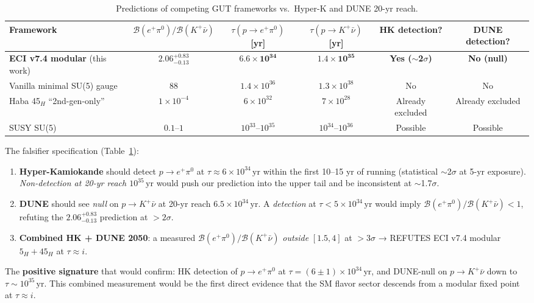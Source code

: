 \documentclass[reprint,prl,nofootinbib,floatfix,linenumbers]{revtex4-2}
\newcommand{\yr}{\,\mathrm{yr}}
\newcommand{\Br}[1]{\mathcal{B}(#1)}
\begin{document}
\begin{table}[t]
\centering
\caption{Predictions of competing GUT frameworks vs.\ Hyper-K and DUNE 20-yr reach.\label{tab:compare}}
\begin{tabular}{lccc|cc}
\hline\hline
Framework & $\Br{e^+\pi^0}/\Br{K^+\bar\nu}$ & $\tau(p\to e^+\pi^0)$ [yr] & $\tau(p\to K^+\bar\nu)$ [yr]
& HK detection? & DUNE detection?\\
\hline
{\bf ECI v7.4 modular} (this work) & $\bm{2.06^{+0.83}_{-0.13}}$ & $\bm{6.6\!\times\!10^{34}}$ & $\bm{1.4\!\times\!10^{35}}$
& {\bf Yes ($\sim$2$\sigma$)} & {\bf No (null)}\\
Vanilla minimal SU(5) gauge & $88$ & $1.4\!\times\!10^{36}$ & $1.3\!\times\!10^{38}$
& No & No\\
Haba 45$_H$ ``2nd-gen-only'' \cite{Haba2024} & $1\!\times\!10^{-4}$ & $6\!\times\!10^{32}$ & $7\!\times\!10^{28}$
& Already excluded & Already excluded\\
SUSY SU(5) \cite{NathPerez2007} & $0.1$--$1$ & $10^{33}$--$10^{35}$ & $10^{34}$--$10^{36}$
& Possible & Possible\\
\hline\hline
\end{tabular}
\end{table}

The falsifier specification (Table~\ref{tab:compare}):
\begin{enumerate}
\item {\bf Hyper-Kamiokande} \cite{HyperK2018} should detect
$p\to e^+\pi^0$ at $\tau\approx 6\!\times\!10^{34}\yr$ within the first
10--15 yr of running (statistical $\sim$2$\sigma$ at 5-yr exposure).
{\em Non-detection at 20-yr reach $10^{35}\yr$} would push our
prediction into the upper tail and be inconsistent at $\sim$1.7$\sigma$.
\item {\bf DUNE} \cite{DUNE2020,Domingo2024} should see {\em null} on
$p\to K^+\bar\nu$ at 20-yr reach $6.5\!\times\!10^{34}\yr$. A {\em
detection} at $\tau<5\!\times\!10^{34}\yr$ would imply
$\Br{e^+\pi^0}/\Br{K^+\bar\nu}<1$, refuting the
$2.06^{+0.83}_{-0.13}$ prediction at $>2\sigma$.
\item {\bf Combined HK + DUNE 2050}: a measured $\Br{e^+\pi^0}/\Br{K^+\bar\nu}$
{\em outside} $[1.5, 4]$ at $>3\sigma$ → REFUTES ECI v7.4 modular
$5_H+45_H$ at $\tau\approx i$.
\end{enumerate}

The {\bf positive signature} that would confirm: HK detection of
$p\to e^+\pi^0$ at $\tau=(6\pm 1)\!\times\!10^{34}\yr$, and DUNE-null
on $p\to K^+\bar\nu$ down to $\tau\sim 10^{35}\yr$. This combined
measurement would be the first direct evidence that the SM flavor
sector descends from a modular fixed point at $\tau\approx i$.
\end{document}
